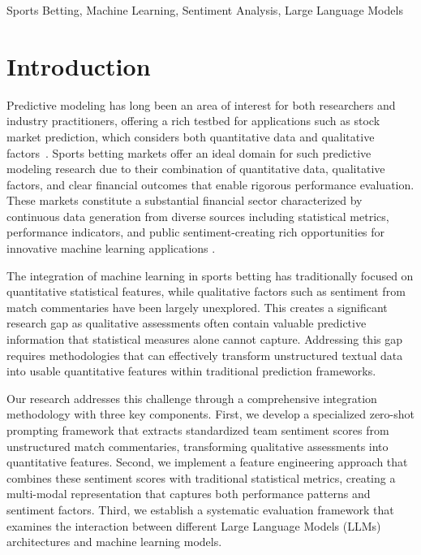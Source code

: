 \documentclass[conference]{IEEEtran}
\begin{document}
\begin{IEEEkeywords}
Sports Betting, Machine Learning, Sentiment Analysis, Large Language Models
\end{IEEEkeywords}

\section{Introduction}
Predictive modeling has long been an area of interest for both researchers and industry practitioners, offering a rich testbed for applications such as stock market prediction, which considers both quantitative data and qualitative factors~\cite{wang2023learning,wang2018stock}.
%
Sports betting markets offer an ideal domain for such predictive modeling research due to their combination of quantitative data, qualitative factors, and clear financial outcomes that enable rigorous performance evaluation. These markets constitute a substantial financial sector characterized by continuous data generation from diverse sources including statistical metrics, performance indicators, and public sentiment-creating rich opportunities for innovative machine learning applications \cite{galekwa2024systematic}.

The integration of machine learning in sports betting has traditionally focused on quantitative statistical features, while qualitative factors such as sentiment from match commentaries have been largely unexplored. This creates a significant research gap as qualitative assessments often contain valuable predictive information that statistical measures alone cannot capture. Addressing this gap requires methodologies that can effectively transform unstructured textual data into usable quantitative features within traditional prediction frameworks.

Our research addresses this challenge through a comprehensive integration methodology with three key components. First, we develop a specialized zero-shot prompting framework that extracts standardized team sentiment scores from unstructured match commentaries, transforming qualitative assessments into quantitative features. Second, we implement a feature engineering approach that combines these sentiment scores with traditional statistical metrics, creating a multi-modal representation that captures both performance patterns and sentiment factors. Third, we establish a systematic evaluation framework that examines the interaction between different Large Language Models (LLMs) architectures and machine learning models.
\end{document}
